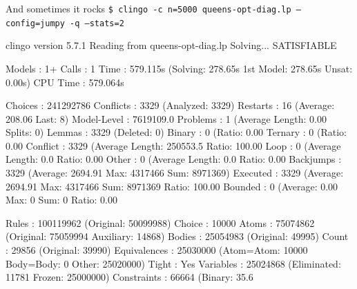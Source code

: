 \begin{frame}[fragile,shrink=1]{And sometimes it rocks}
  \mbox{\Large\texttt{\$ clingo -c n=5000 queens-opt-diag.lp --config=jumpy -q --stats=2}}
  \pause
\begin{semiverbatim}
clingo version 5.7.1
Reading from queens-opt-diag.lp
Solving...
SATISFIABLE

Models       : 1+
Calls        : 1
Time         : 579.115s (Solving: 278.65s 1st Model: 278.65s Unsat: 0.00s)
CPU Time     : 579.064s

Choices      : 241292786
Conflicts    : 3329     (Analyzed: 3329)
Restarts     : 16       (Average: 208.06 Last: 8)
Model-Level  : 7619109.0
Problems     : 1        (Average Length: 0.00 Splits: 0)
Lemmas       : 3329     (Deleted: 0)
  Binary     : 0        (Ratio:   0.00%
  Ternary    : 0        (Ratio:   0.00%
  Conflict   : 3329     (Average Length: 250553.5 Ratio: 100.00%
  Loop       : 0        (Average Length:    0.0 Ratio:   0.00%
  Other      : 0        (Average Length:    0.0 Ratio:   0.00%
Backjumps    : 3329     (Average: 2694.91 Max: 4317466 Sum: 8971369)
  Executed   : 3329     (Average: 2694.91 Max: 4317466 Sum: 8971369 Ratio: 100.00%
  Bounded    : 0        (Average:  0.00 Max:   0 Sum:      0 Ratio:   0.00%

Rules        : 100119962 (Original: 50099988)
  Choice     : 10000
Atoms        : 75074862 (Original: 75059994 Auxiliary: 14868)
Bodies       : 25054983 (Original: 49995)
  Count      : 29856    (Original: 39990)
Equivalences : 25030000 (Atom=Atom: 10000 Body=Body: 0 Other: 25020000)
Tight        : Yes
Variables    : 25024868 (Eliminated: 11781 Frozen: 25000000)
Constraints  : 66664    (Binary:  35.6%
\end{semiverbatim}
\end{frame}
%
